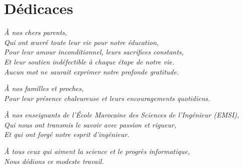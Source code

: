 \chapter*{Dédicaces}

\vspace*{2cm}

\begin{center}
    \large
    \emph{À nos chers parents, \\
    Qui ont œuvré toute leur vie pour notre éducation, \\
    Pour leur amour inconditionnel, leurs sacrifices constants, \\
    Et leur soutien indéfectible à chaque étape de notre vie. \\
    Aucun mot ne saurait exprimer notre profonde gratitude.}
    
    \vspace{1.5cm}
    
    \emph{À nos familles et proches, \\
    Pour leur présence chaleureuse et leurs encouragements quotidiens.}
    
    \vspace{1.5cm}
    
    \emph{À nos enseignants de l'École Marocaine des Sciences de l'Ingénieur (EMSI), \\
    Qui nous ont transmis le savoir avec passion et rigueur, \\
    Et qui ont forgé notre esprit d'ingénieur.}
    
    \vspace{1.5cm}
    
    \emph{À tous ceux qui aiment la science et le progrès informatique, \\
    Nous dédions ce modeste travail.}
\end{center}
\newpage
